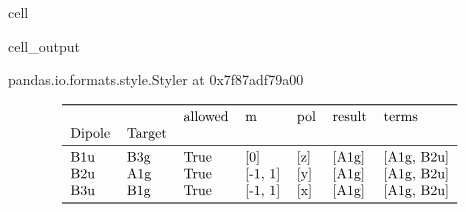 \documentclass[letterpaper,table,10pt,english]{jupyterBook}
\begin{document}
\begin{sphinxuseclass}{cell}
\begin{sphinxVerbatimOutput}
\begin{sphinxuseclass}{cell_output}
\begin{sphinxVerbatim}[commandchars=\\\{\}]
\PYGZlt{}pandas.io.formats.style.Styler at 0x7f87adf79a00\PYGZgt{}
\end{sphinxVerbatim}
\begin{equation*}
\begin{split}\begin{tabular}{lllllll}
\toprule
    &     & allowed &        m &  pol & result &       terms \\
Dipole & Target &         &          &      &        &             \\
\midrule
B1u & B3g &    True &      [0] &  [z] &  [A1g] &  [A1g, B2u] \\
B2u & A1g &    True &  [-1, 1] &  [y] &  [A1g] &  [A1g, B2u] \\
B3u & B1g &    True &  [-1, 1] &  [x] &  [A1g] &  [A1g, B2u] \\
\bottomrule
\end{tabular}\end{split}
\end{equation*}
\end{sphinxuseclass}\end{sphinxVerbatimOutput}

\end{sphinxuseclass}
\end{document}

